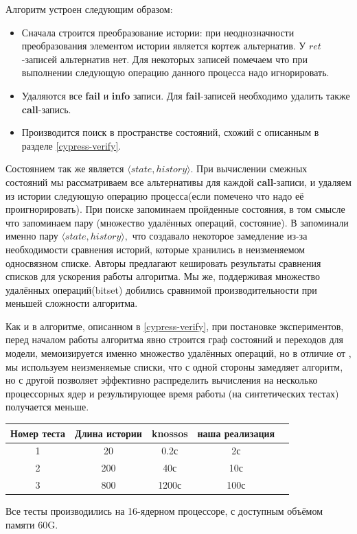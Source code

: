 \documentclass[pdftex,ptm,14pt,a4paper]{extreport}
\theoremstyle{definition}
\begin{document}
Алгоритм устроен следующим образом:
\begin{itemize}
    \item Сначала строится преобразование истории: при неоднозначности преобразования элементом истории является кортеж альтернатив.
        У $ret$-записей альтернатив нет. Для некоторых записей помечаем что при выполнении следующую операцию
        данного процесса надо игнорировать.
    \item Удаляются все \textbf{fail} и \textbf{info} записи. Для \textbf{fail}-записей необходимо удалить также \textbf{call}-запись.
    \item Производится поиск в пространстве состояний, схожий с описанным в разделе \ref{cypress-verify}.
\end{itemize}

Состоянием так же является $\langle state, history \rangle.$
При вычислении смежных состояний мы рассматриваем все альтернативы для каждой \textbf{call}-записи, и удаляем
из истории следующую операцию процесса(если помечено что надо её проигнорировать).
При поиске запоминаем пройденные состояния, в том смысле что запоминаем пару (множество удалённых операций, состояние).
В \cite{horn-faster} запоминали именно пару $\langle state, history \rangle,$ что создавало некоторое замедление из-за
необходимости сравнения историй, которые хранились в неизменяемом односвязном списке. Авторы предлагают кешировать результаты
сравнения списков для ускорения работы алгоритма. Мы же, поддерживая множество удалённых операций(bitset) добились сравнимой
производительности при меньшей сложности алгоритма.

Как и в алгоритме, описанном в \ref{cypress-verify}, при постановке экспериментов,
перед началом работы алгоритма явно строится граф состояний и переходов для модели,
мемоизируется именно множество удалённых операций, но в отличие от \cite{knossos}, мы
используем неизменяемые списки, что с одной стороны замедляет алгоритм, но с другой позволяет
эффективно распределить вычисления на несколько процессорных ядер и результирующее время работы
(на синтетических тестах) получается меньше.

\begin{center}
  \begin{tabular}{| c | c | c | c | c| }
      \hline
        Номер теста & Длина истории & knossos & наша реализация \\
        \hline
        1           & 20            & 0.2с     & 2с             \\
        \hline
        2           & 200           & 40с      & 10с              \\
        \hline
        3           & 800           & 1200с    & 100с              \\
        \hline
  \end{tabular}
\end{center}
Все тесты производились на 16-ядерном процессоре, с доступным объёмом памяти 60G.
\end{document}

